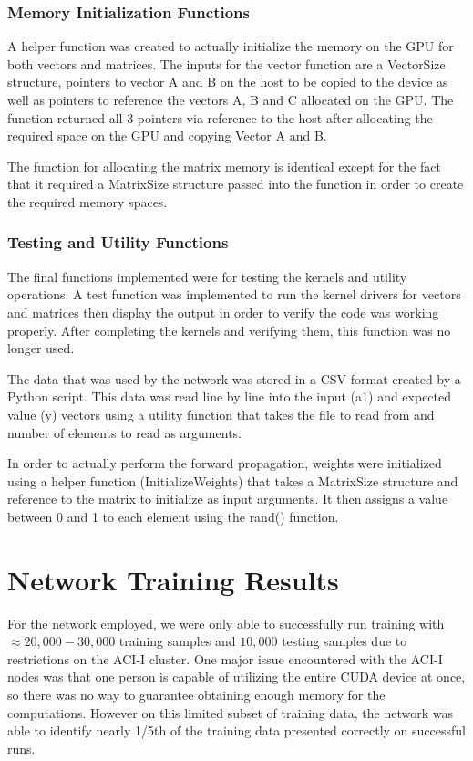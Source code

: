 \documentclass[11pt]{article}
\begin{document}
\subsubsection{Memory Initialization Functions}
A helper function was created to actually initialize the memory on the GPU for both vectors and matrices. The inputs for the vector function are a VectorSize structure, pointers to vector A and B on the host to be copied to the device as well as pointers to reference the vectors A, B and C allocated on the GPU. The function returned all 3 pointers via reference to the host after allocating the required space on the GPU and copying Vector A and B.

The function for allocating the matrix memory is identical except for the fact that it required a MatrixSize structure passed into the function in order to create the required memory spaces.

\subsubsection{Testing and Utility Functions}
The final functions implemented were for testing the kernels and utility operations. A test function was implemented to run the kernel drivers for vectors and matrices then display the output in order to verify the code was working properly. After completing the kernels and verifying them, this function was no longer used.

The data that was used by the network was stored in a CSV format created by a Python script. This data was read line by line into the input (a1) and expected value (y) vectors using a utility function that takes the file to read from and number of elements to read as arguments.

In order to actually perform the forward propagation, weights were initialized using a helper function (InitializeWeights) that takes a MatrixSize structure and reference to the matrix to initialize as input arguments. It then assigns a value between 0 and 1 to each element using the rand() function.

\section{Network Training Results}
For the network employed, we were only able to successfully run training with $\approx 20,000-30,000$ training samples and $10,000$ testing samples due to restrictions on the ACI-I cluster. One major issue encountered with the ACI-I nodes was that one person is capable of utilizing the entire CUDA device at once, so there was no way to guarantee obtaining enough memory for the computations. However on this limited subset of training data, the network was able to identify nearly 1/5th of the training data presented correctly on successful runs.
\end{document}
